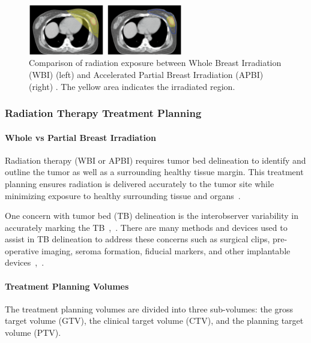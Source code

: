 \begin{figure}[h!]
        \centering
        \includegraphics[width=0.6\textwidth]{../figs/introduction/WBI_vs_APBI_irradiation_comparison.png}
        \caption{Comparison of radiation exposure between Whole Breast Irradiation (WBI) (left) and Accelerated Partial Breast Irradiation (APBI) (right) \cite{RefWorks:RefID:157-thomasscience}. The yellow area indicates the irradiated region.}
        \label{fig:introduction:WBI_vs_APBI_irradiation_comparison}
\end{figure}

\subsubsection{Radiation Therapy Treatment Planning\label{sec:introduction:radiationtherapy:treatmentplanning}}

\paragraph*{Whole vs Partial Breast Irradiation\label{sec:introduction:radiationtherapy:treatmentplanning:WBIvsPBI}}
Radiation therapy (WBI or APBI) requires tumor bed delineation to identify and outline the tumor as well as a surrounding healthy tissue margin. This treatment planning ensures radiation is delivered accurately to the tumor site while minimizing exposure to healthy surrounding tissue and organs~\cite{RefWorks:RefID:197-den2015postlumpectomy}.

One concern with tumor bed (TB) delineation is the interobserver variability in accurately marking the TB~\cite{RefWorks:RefID:197-den2015postlumpectomy},~\cite{RefWorks:RefID:179-yang2013tumor}. There are many methods and devices used to assist in TB delineation to address these concerns such as surgical clips, pre-operative imaging, seroma formation, fiducial markers, and other implantable devices~\cite{RefWorks:RefID:179-yang2013tumor},~\cite{RefWorks:RefID:25-acree2022review}.

\paragraph*{Treatment Planning Volumes\label{sec:introduction:radiationtherapy:treatmentplanning:planningVolumes}}
The treatment planning volumes are divided into three sub-volumes: the gross target volume (GTV), the clinical target volume (CTV), and the planning target volume (PTV).

